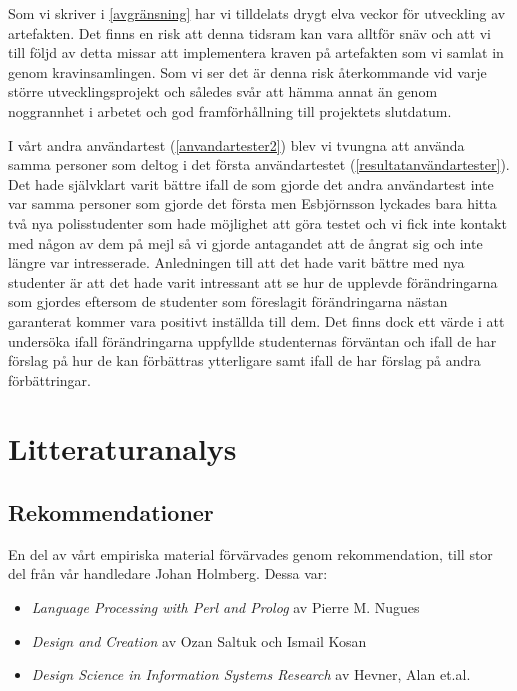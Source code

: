 \documentclass[swedish]{maucsthesis}
\begin{document}
Som vi skriver i \cref{avgränsning} har vi tilldelats drygt elva veckor
för utveckling av artefakten. Det finns en risk att denna tidsram kan vara
alltför snäv och att vi till följd av detta missar att implementera kraven på
artefakten som vi samlat in genom kravinsamlingen. Som vi ser det är denna risk
återkommande vid varje större utvecklingsprojekt och således svår att hämma
annat än genom noggrannhet i arbetet och god framförhållning till projektets
slutdatum.

I vårt andra användartest (\cref{anvandartester2}) blev vi tvungna att använda samma
personer som deltog i det första användartestet (\cref{resultatanvändartester}).
Det hade självklart varit bättre ifall de som gjorde det andra användartest inte
var samma personer som gjorde det första men Esbjörnsson lyckades bara hitta två
nya polisstudenter som hade möjlighet att göra testet och vi fick inte kontakt
med någon av dem på mejl så vi gjorde antagandet att de ångrat sig och inte
längre var intresserade. Anledningen till att det hade varit bättre med nya
studenter är att det hade varit intressant att se hur de upplevde förändringarna
som gjordes eftersom de studenter som föreslagit förändringarna nästan
garanterat kommer vara positivt inställda till dem. Det finns dock ett värde i
att undersöka ifall förändringarna uppfyllde studenternas förväntan och ifall de
har förslag på hur de kan förbättras ytterligare samt ifall de har förslag på
andra förbättringar.

\section{Litteraturanalys}\label{litteraturstudie}

\subsection{Rekommendationer}

En del av vårt empiriska material förvärvades genom rekommendation, till stor del från vår
handledare Johan Holmberg. Dessa var:
\begin{itemize}
\item \textit{Language Processing with Perl and Prolog} av Pierre M. Nugues
\item \textit{Design and Creation} av Ozan Saltuk och Ismail Kosan
\item \textit{Design Science in Information Systems Research} av Hevner, Alan et.al.
\end{itemize}
\end{document}

